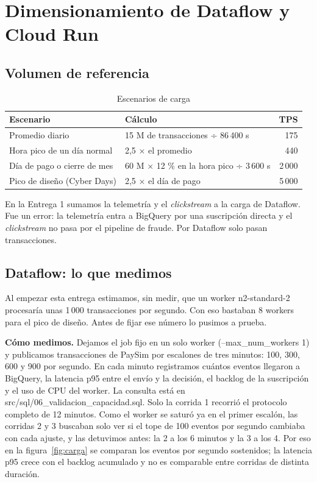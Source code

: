 \documentclass[11pt,a4paper]{article}
\DeclareRobustCommand{\cod}[1]{{\small\ttfamily\codbreaks #1}}
\DeclareRobustCommand{\codbreaks}{\let\oldus\_\renewcommand{\_}{\oldus\allowbreak}}
\begin{document}
\section{Dimensionamiento de Dataflow y Cloud Run}

\subsection{Volumen de referencia}

\begin{table}[H]
\centering\small
\caption{Escenarios de carga}
\label{tab:escenarios}
\begin{tabularx}{0.85\linewidth}{LP{5.5cm}r}
\toprule
\textbf{Escenario} & \textbf{Cálculo} & \textbf{TPS}\\
\midrule
Promedio diario & 15 M de transacciones ÷ 86\,400 s & 175\\
 Hora pico de un día normal & 2,5 × el promedio & 440\\
Día de pago o cierre de mes & 60 M × 12 \% en la hora pico ÷ 3\,600 s & 2\,000\\
 Pico de diseño (Cyber Days) & 2,5 × el día de pago & 5\,000\\
\bottomrule
\end{tabularx}
\end{table}

En la Entrega 1 sumamos la telemetría y el \textit{clickstream} a la carga de Dataflow. Fue un error: la telemetría entra a BigQuery por una suscripción directa y el \textit{clickstream} no pasa por el pipeline de fraude. Por Dataflow solo pasan transacciones.

\subsection{Dataflow: lo que medimos}\label{sec:dataflow}

Al empezar esta entrega estimamos, sin medir, que un worker \cod{n2-standard-2} procesaría unas 1\,000 transacciones por segundo. Con eso bastaban 8 workers para el pico de diseño. Antes de fijar ese número lo pusimos a prueba.

\textbf{Cómo medimos.} Dejamos el job fijo en un solo worker (\cod{--max\_num\_workers 1}) y publicamos transacciones de PaySim por escalones de tres minutos: 100, 300, 600 y 900 por segundo. En cada minuto registramos cuántos eventos llegaron a BigQuery, la latencia p95 entre el envío y la decisión, el backlog de la suscripción y el uso de CPU del worker. La consulta está en \cod{src/sql/06\_validacion\_capacidad.sql}. Solo la corrida 1 recorrió el protocolo completo de 12 minutos. Como el worker se saturó ya en el primer escalón, las corridas 2 y 3 buscaban solo ver si el tope de 100 eventos por segundo cambiaba con cada ajuste, y las detuvimos antes: la 2 a los 6 minutos y la 3 a los 4. Por eso en la figura~\ref{fig:carga} se comparan los eventos por segundo sostenidos; la latencia p95 crece con el backlog acumulado y no es comparable entre corridas de distinta duración.
\end{document}
